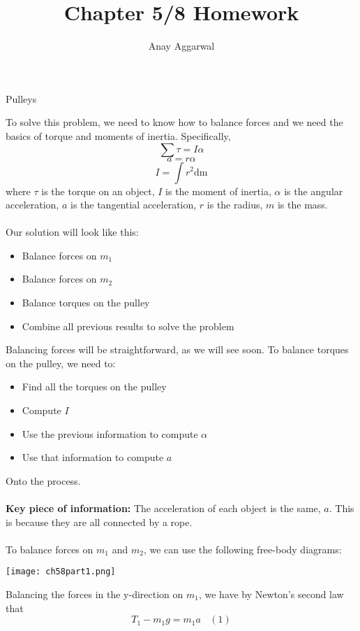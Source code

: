 \documentclass[11pt]{scrartcl}
\title{Chapter 5/8 Homework}
\author{Anay Aggarwal}
\begin{document}
\maketitle

\begin{example}
  Pulleys
\end{example}
\begin{soln}
  To solve this problem, we need to know how to balance forces and we need
  the basics of torque and moments of inertia. Specifically,
  $$\sum \tau = I\alpha$$
  $$a=r\alpha$$
  $$I=\int r^2\mathrm{dm}$$
  where $\tau$ is the torque on an object, $I$ is the moment of inertia,
  $\alpha$ is the angular acceleration, $a$ is the tangential acceleration,
  $r$ is the radius, $m$ is the mass.
  \\ \\
  Our solution will look like this:
  \begin{itemize}
    \item Balance forces on $m_1$
    \item Balance forces on $m_2$
    \item Balance torques on the pulley
    \item Combine all previous results to solve the problem
  \end{itemize}
  Balancing forces will be straightforward, as we will see soon. To balance torques on the pulley, we need to:
  \begin{itemize}
    \item Find all the torques on the pulley
    \item Compute $I$
    \item Use the previous information to compute $\alpha$
    \item Use that information to compute $a$
  \end{itemize}
  Onto the process.
  \\ \\
  \textbf{Key piece of information: } The acceleration of each object is the same,
  $a$. This is because they are all connected by a rope.
  \\ \\
  To balance forces on $m_1$ and $m_2$, we can use the following free-body diagrams:
  \begin{center}
    \texttt{[image: ch58part1.png]}
  \end{center}
  Balancing the forces in the y-direction on $m_1$, we have by Newton's second law that
  $$T_1-m_1g=m_1 a~~~~(1)$$

\end{soln}
\end{document}
